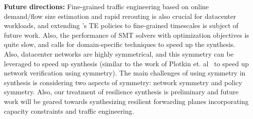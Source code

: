\noindent
{\bf Future directions:}  
Fine-grained traffic engineering based on online demand/flow size estimation and 
rapid rerouting is also crucial for datacenter workloads, and extending \name's
TE policies to fine-grained timescales is subject of future work.
Also, the performance
of SMT solvers with optimization objectives is quite slow, and calls for 
domain-specific techniques to speed up the synthesis. Also, datacenter
networks are highly symmetrical, and this symmetry can be leveraged
to speed up synthesis (similar to the work of Plotkin et. al~\cite{symmetry} to
speed up network verification using symmetry). The main challenges of
using symmetry in synthesis is considering two aspects of symmetry: network
symmetry and policy symmetry. Also, our treatment of resilience synthesis
is preliminary and future work will be geared towards synthesizing resilient
forwarding planes incorporating capacity constraints and traffic engineering.
 
